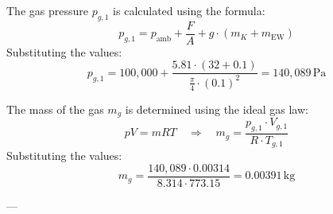The gas pressure \( p_{g,1} \) is calculated using the formula:  
\[
p_{g,1} = p_{\text{amb}} + \frac{F}{A} + g \cdot (m_K + m_{\text{EW}})
\]  
Substituting the values:  
\[
p_{g,1} = 100,000 + \frac{5.81 \cdot (32 + 0.1)}{\frac{\pi}{4} \cdot (0.1)^2} = 140,089 \, \text{Pa}
\]  

The mass of the gas \( m_g \) is determined using the ideal gas law:  
\[
pV = mRT \quad \Rightarrow \quad m_g = \frac{p_{g,1} \cdot V_{g,1}}{R \cdot T_{g,1}}
\]  
Substituting the values:  
\[
m_g = \frac{140,089 \cdot 0.00314}{8.314 \cdot 773.15} = 0.00391 \, \text{kg}
\]  

---